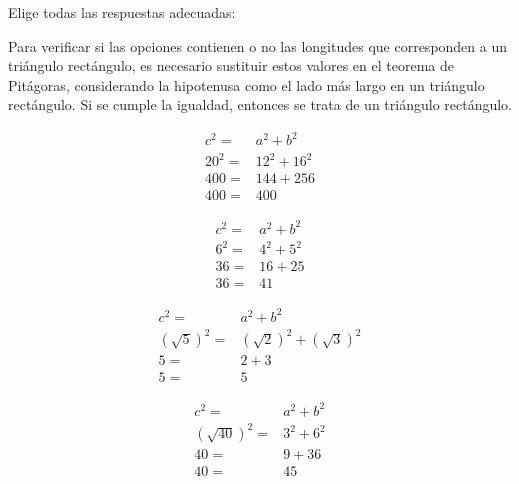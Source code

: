Elige todas las respuestas adecuadas:

\begin{solutionbox}{6cm}
    Para verificar si las opciones contienen o no las longitudes que corresponden a un triángulo rectángulo, es necesario sustituir estos valores en el teorema de Pitágoras, considerando la hipotenusa como el lado más largo en un triángulo rectángulo. Si se cumple la igualdad, entonces se trata de un triángulo rectángulo.

    \begin{multicols}{4}
        \begin{align*}
            c^2=  & a^2+b^2  \\
            20^2= & 12^2+16^2 \\
            400=  & 144+256   \\
            400=  & 400
        \end{align*}

        \begin{align*}
            c^2=           & a^2+b^2   \\
            6^2=           & 4^2+5^2   \\
            36=            & 16+25     \\
            36=            & 41          
        \end{align*}

        \begin{align*}
            c^2=           & a^2+b^2   \\
            (\sqrt{5})^2=  & (\sqrt{2})^2 + (\sqrt{3})^2 \\
            5=             & 2+3      \\
            5=             & 5
        \end{align*}

        \begin{align*}
            c^2=           & a^2+b^2   \\
            (\sqrt{40})^2= & 3^2 + 6^2 \\
            40=            & 9+36      \\
            40=            & 45
        \end{align*}
    \end{multicols}
\end{solutionbox}